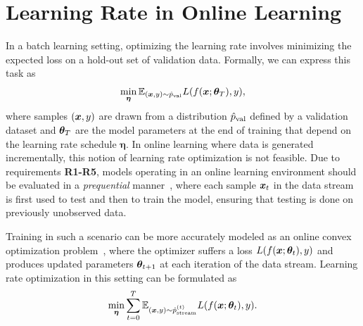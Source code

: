 \documentclass{article} %
\begin{document}
\section{Learning Rate in Online Learning}

In a batch learning setting, optimizing the learning rate involves minimizing the expected loss on a hold-out set of validation data.
Formally, we can express this task as
\begin{equation}
   \label{eq:batch_lr_optim}
   \min_{\bm{\eta}} \mathbb{E}_{({\bm{x}}, y) \sim \hat{p}_{\rm{val}}} L(f({\bm{x}}; {\bm{\theta}}_T), y),
\end{equation}
where samples $({\bm{x}}, y)$ are drawn from a distribution $\hat{p}_{\rm{val}}$ defined by a validation dataset and ${\bm{\theta}}_T$ are the model parameters at the end of training that depend on the learning rate schedule $\bm{\eta}$.
In online learning where data is generated incrementally, this notion of learning rate optimization is not feasible.
Due to requirements \textbf{R1-R5}, models operating in an online learning environment should be evaluated in a \textit{prequential} manner~\citep{bifetMOAMassiveOnline2010}, where each sample ${\bm{x}}_t$ in the data stream is first used to test and then to train the model, ensuring that testing is done on previously unobserved data.

Training in such a scenario can be more accurately modeled as an online convex optimization problem~\citep{shalev-shwartzOnlineLearningOnline2011,hazanIntroductionOnlineConvex2016}, where the optimizer suffers a loss $L(f({\bm{x}}; {\bm{\theta}}_t), y)$ and produces updated parameters ${\bm{\theta}}_{t+1}$ at each iteration of the data stream.
Learning rate optimization in this setting can be formulated as
\begin{equation}
   \label{eq:stream_lr_optim}
   \min_{\bm{\eta}} \sum_{t=0}^{T} \mathbb{E}_{({\bm{x}}, y) \sim \hat{p}_{\rm{stream}}^{(t)}} L(f({\bm{x}}; {\bm{\theta}}_t), y).
\end{equation}
\end{document}
